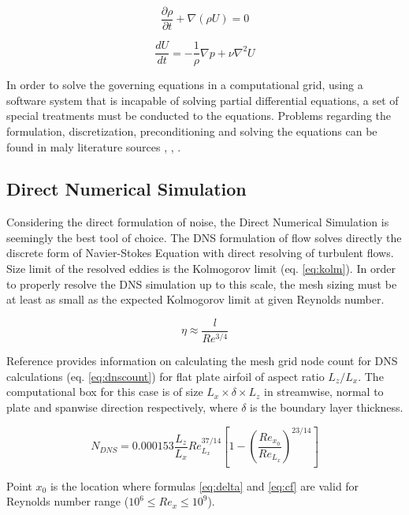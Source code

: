 \begin{equation} \label{eq:cont}
\frac{\partial \rho}{\partial t} + \nabla (\rho U) = 0
\end{equation}

\begin{equation} \label{eq:momentum}
\frac{dU}{dt} = - \frac{1}{\rho} \nabla p + \nu \nabla^{2} U
\end{equation}

In order to solve the governing equations in a computational grid, using a software system that is incapable of solving partial differential equations, a set of special treatments must be conducted to the equations. Problems regarding the formulation, discretization, preconditioning and solving the equations can be found in maly literature sources \citep{anderson_cfd}, \citep{versteeg_cfd}, \citep{fluenttheory}.

\subsection{Direct Numerical Simulation} \label{DNS}
Considering the direct formulation of noise, the Direct Numerical Simulation is seemingly the best tool of choice. The DNS formulation of flow solves directly the discrete form of Navier-Stokes Equation with direct resolving of turbulent flows. Size limit of the resolved eddies is the Kolmogorov limit (eq. \ref{eq:kolm}). In order to properly resolve the DNS simulation up to this scale, the mesh sizing must be at least as small as the expected Kolmogorov limit at given Reynolds number.

\begin{equation} \label{eq:kolm}
\eta \approx \frac{l}{Re^{3/4}}
\end{equation}

Reference \citep{LES_size} provides information on calculating the mesh grid node count for DNS calculations (eq. \ref{eq:dnscount}) for flat plate airfoil of aspect ratio $L_z / L_x$. The computational box for this case is of size $L_x \times \delta \times L_z$ in streamwise, normal to plate and spanwise direction respectively, where $\delta$ is the boundary layer thickness.

\begin{equation} \label{eq:dnscount}
N_{DNS} = 0.000153 \frac{L_z}{L_x} Re_{L_x}^{37/14} \left[ 1 - \left( \frac{Re_{x_0}}{Re_{L_x}} \right)^{23/14} \right]
\end{equation}

Point $x_0$ is the location where formulas \ref{eq:delta} and \ref{eq:cf} are valid for Reynolds number range ($10^6 \leq Re_x \leq 10^9$).

